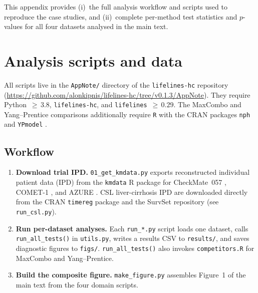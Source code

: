 \documentclass[11pt]{article}
\begin{document}
\noindent
This appendix provides (i)~the full analysis workflow and scripts used to
reproduce the case studies, and (ii)~complete per-method test statistics
and $p$-values for all four datasets analysed in the main text.

\section{Analysis scripts and data}

All scripts live in the \texttt{AppNote/} directory of the
\texttt{lifelines-hc} repository
(\url{https://github.com/alonkipnis/lifelines-hc/tree/v0.1.3/AppNote}).
They require Python~${\geq}\,3.8$, \texttt{lifelines-hc}, and
\texttt{lifelines}~${\geq}\,0.29$.
The MaxCombo and Yang--Prentice comparisons additionally require
\texttt{R} with the CRAN packages \texttt{nph} \citep{ristl2021nph}
and \texttt{YPmodel} \citep{yang2005,yang2010improved}.

\subsection*{Workflow}

\begin{enumerate}
  \item \textbf{Download trial IPD.}
        \texttt{01\_get\_kmdata.py} exports reconstructed individual patient
        data (IPD) from the \texttt{kmdata} R package
        \citep{guyot2012} for CheckMate~057 \citep{borghaei2015},
        COMET-1 \citep{smith2016}, and AZURE
        \citep{coleman2011,coleman2014}.
        CSL liver-cirrhosis IPD are downloaded directly from the CRAN
        \texttt{timereg} package and the SurvSet repository
        \citep{csl_data,survset2022} (see \texttt{run\_csl.py}).
  \item \textbf{Run per-dataset analyses.}
        Each \texttt{run\_*.py} script loads one dataset, calls
        \texttt{run\_all\_tests()} in \texttt{utils.py}, writes a results
        CSV to \texttt{results/}, and saves diagnostic figures to
        \texttt{figs/}.  \texttt{run\_all\_tests()} also invokes
        \texttt{competitors.R} for MaxCombo and Yang--Prentice.
  \item \textbf{Build the composite figure.}
        \texttt{make\_figure.py} assembles Figure~1 of the main text from
        the four domain scripts.
\end{enumerate}
\end{document}

